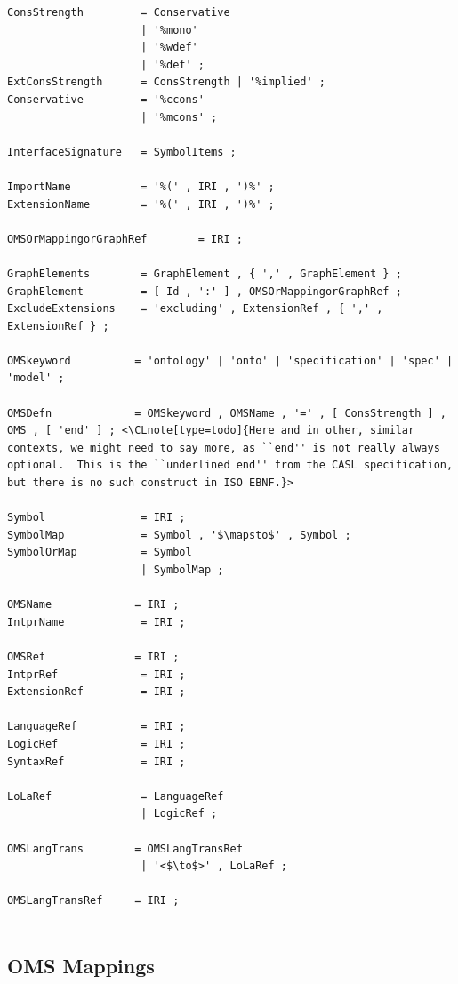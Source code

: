 \documentclass[10pt,%
\ifpretendfinal
final%
\else
draft%
\fi,
]{scrreprt}
\makeatletter
\newcommand*\CommentAuthor{}
\renewcommand*\CommentAuthor{#1}}
\newcommand*\CommentDate{}
\renewcommand*\CommentDate{#1}}
\newcommand*\CommentId{}
\renewcommand*\CommentId{#1}}
\newcommand*\CommentType{}
\renewcommand*\CommentType{#1}}
\newcommand*{\SetCommentColorByType}[1]{%
\edef\localType{{#1}}%
\expandafter\ifstrequal\localType{q-aut}{\colorlet{CommentColor}{red}}{%
\expandafter\ifstrequal\localType{q-all}{\colorlet{CommentColor}{orange}}{%
\expandafter\ifstrequal\localType{todo}{\colorlet{CommentColor}{orange}}{%
\expandafter\ifstrequal\localType{fyi}{\colorlet{CommentColor}{lightgray}}{%
\colorlet{CommentColor}{yellow}}}}}}
\newcommand*{\SetCommentPrefixByType}[1]{%
\edef\localType{{#1}}%
\expandafter\@ifmtarg\localType{%
\edef\CommentPrefix{}%
}{%
\caseupper[q]{#1}%
\edef\CommentPrefix{\thestring: }%
}}
\newcommand*{\initComment}[1]{%
\setkeys{Comment}{#1}%
\SetCommentColorByType{\CommentType}%
\relax%
\SetCommentPrefixByType{\CommentType}%
\relax%
}
\newcommand*{\todonote}[2][]{%
\initComment{#1}%
\pdfcomment[author=\CommentAuthor,color=CommentColor,date=\CommentDate,id=\CommentId]{%
\CommentPrefix
#2}}
\renewcommand*{\todonote}[2][]{%
\initComment{#1}%
\ednote{\CommentPrefix #2}}
\newcommand*{\CLnote}[2][author=Christoph Lange]{%
\todonote[author=Christoph Lange,#1]{#2} 
}
\newcommand{\ssclause}[1]{\subsection{#1}}
\makeatother
\begin{document}
\begin{lstlisting}[language=ebnf,escapeinside={<>},mathescape]
ConsStrength         = Conservative
                     | '%mono'
                     | '%wdef'
                     | '%def' ;
ExtConsStrength      = ConsStrength | '%implied' ;
Conservative         = '%ccons'
                     | '%mcons' ; 

InterfaceSignature   = SymbolItems ;

ImportName           = '%(' , IRI , ')%' ;
ExtensionName        = '%(' , IRI , ')%' ;

OMSOrMappingorGraphRef        = IRI ;

GraphElements        = GraphElement , { ',' , GraphElement } ;
GraphElement         = [ Id , ':' ] , OMSOrMappingorGraphRef ;
ExcludeExtensions    = 'excluding' , ExtensionRef , { ',' , ExtensionRef } ;

OMSkeyword          = 'ontology' | 'onto' | 'specification' | 'spec' | 'model' ;

OMSDefn             = OMSkeyword , OMSName , '=' , [ ConsStrength ] , OMS , [ 'end' ] ; <\CLnote[type=todo]{Here and in other, similar contexts, we might need to say more, as ``end'' is not really always optional.  This is the ``underlined end'' from the CASL specification, but there is no such construct in ISO EBNF.}> 

Symbol               = IRI ;
SymbolMap            = Symbol , '$\mapsto$' , Symbol ;
SymbolOrMap          = Symbol
                     | SymbolMap ;

OMSName             = IRI ;
IntprName            = IRI ;

OMSRef              = IRI ;
IntprRef             = IRI ;
ExtensionRef         = IRI ;

LanguageRef          = IRI ;
LogicRef             = IRI ;
SyntaxRef            = IRI ;

LoLaRef              = LanguageRef
                     | LogicRef ;

OMSLangTrans        = OMSLangTransRef
                     | '<$\to$>' , LoLaRef ;

OMSLangTransRef     = IRI ;


\end{lstlisting}

\ssclause{OMS Mappings}
\end{document}

